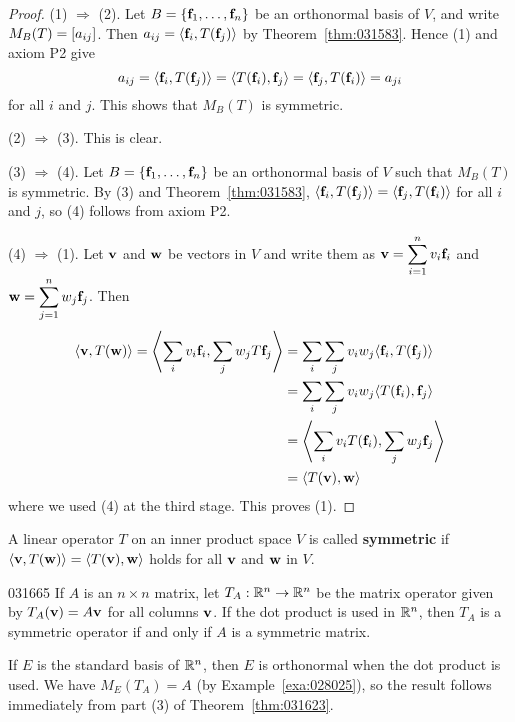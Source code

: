 \begin{proof}
(1) $\Rightarrow$ (2). Let $B = \{\textbf{f}_{1}, \dots, \textbf{f}_{n}\}$ be an orthonormal basis of $V$, and write $M_{B}(T) = \left[ a_{ij} \right]$. Then $a_{ij} = \langle\textbf{f}_{i}, T(\textbf{f}_{j}) \rangle $ by Theorem~\ref{thm:031583}. Hence (1) and axiom P2 give
\begin{equation*}
a_{ij} = \langle \textbf{f}_i, T(\textbf{f}_j) \rangle
= \langle T(\textbf{f}_i), \textbf{f}_j \rangle 
= \langle \textbf{f}_j, T(\textbf{f}_i) \rangle
= a_{ji}
\end{equation*}
for all $i$ and $j$. This shows that $M_{B}(T)$ is symmetric.

(2) $\Rightarrow$ (3). This is clear.

(3) $\Rightarrow$ (4). Let $B = \{\textbf{f}_{1}, \dots, \textbf{f}_{n}\}$ be an orthonormal basis of $V$ such that $M_{B}(T)$ is symmetric. By (3) and Theorem~\ref{thm:031583}, $\langle\textbf{f}_{i}, T(\textbf{f}_{j}) \rangle = \langle\textbf{f}_{j}, T(\textbf{f}_{i}) \rangle$ for all $i$ and $j$, so (4) follows from axiom P2.

(4) $\Rightarrow$ (1). Let $\textbf{v}$ and $\textbf{w}$ be vectors in $V$ and write them as $\textbf{v} = \displaystyle \sum_{i = 1}^{n} v_i\textbf{f}_i$ and 
 $\textbf{w} = \displaystyle \sum_{j = 1}^{n} w_j\textbf{f}_j$. Then
\begin{align*}
\langle \textbf{v}, T(\textbf{w}) \rangle = \left\langle \sum_{i} v_i\textbf{f}_i, \sum_{j} w_jT\textbf{f}_j \right\rangle &= \sum_{i} \sum_{j} v_iw_j \langle \textbf{f}_i, T(\textbf{f}_j) \rangle \\
&= \sum_{i} \sum_{j} v_iw_j \langle T(\textbf{f}_i), \textbf{f}_j \rangle \\
&= \left\langle \sum_{i} v_i T(\textbf{f}_i), \sum_{j} w_j \textbf{f}_j \right\rangle \\
&= \langle T(\textbf{v}), \textbf{w} \rangle
\end{align*}
where we used (4) at the third stage. This proves (1).
\end{proof}

\noindent A linear operator $T$ on an inner product space $V$ is called \textbf{symmetric} if $\langle\textbf{v}, T(\textbf{w}) \rangle = \langle T(\textbf{v}), \textbf{w} \rangle$ holds for all $\textbf{v}$ and $\textbf{w}$ in $V$.

\begin{example}{}{031665}
If $A$ is an $n \times n$ matrix, let $T_{A} : \mathbb{R}^n \to \mathbb{R}^n$ be the matrix operator given by $T_{A}(\textbf{v}) = A\textbf{v}$ for all columns $\textbf{v}$. If the dot product is used in $\mathbb{R}^n$, then $T_{A}$ is a symmetric operator if and only if $A$ is a symmetric matrix.

\begin{solution}
If $E$ is the standard basis of $\mathbb{R}^n$, then $E$ is orthonormal when the dot product is used. We have $M_{E}(T_{A}) = A$ (by Example~\ref{exa:028025}), so the result follows immediately from part (3) of Theorem~\ref{thm:031623}.
\end{solution}
\end{example}

